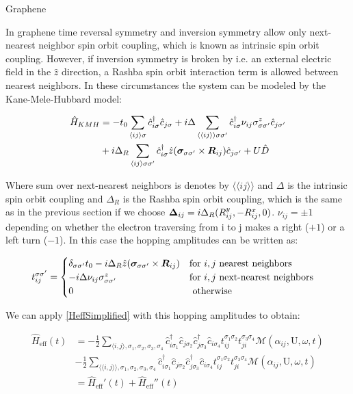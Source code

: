 \begin{section}{Graphene}

In graphene time reversal symmetry and inversion symmetry allow only next-nearest neighbor spin orbit coupling, which is known as intrinsic spin orbit coupling. However, if inversion symmetry is broken by i.e. an external electric field in the $\hat{z}$ direction, a Rashba spin orbit interaction term is allowed between nearest neighbors. In these circumstances the system can be modeled by the Kane-Mele-Hubbard model:

\begin{align}
\hat{H}_{KMH} &= -t_0\sum_{\langle i j \rangle \sigma} \hat{c}^{\dagger}_{i\sigma}\hat{c}_{j\sigma} + i\Delta \sum_{\langle \langle i j \rangle \rangle \sigma \sigma'} \hat{c}^{\dagger}_{i\sigma} \nu_{ij} \sigma^z_{\sigma \sigma'} \hat{c}_{j\sigma'} \nonumber \\
&+ i\Delta_R \sum_{\langle i j \rangle \sigma \sigma'} \hat{c}^{\dagger}_{i\sigma} \hat{z}(\boldsymbol{\sigma}_{\sigma \sigma'} \times \boldsymbol{R}_{ij}) \hat{c}_{j\sigma'} + U\hat{D}
\end{align}

Where sum over next-nearest neighbors is denotes by $\langle \langle i j \rangle \rangle$ and $\Delta$ is the intrinsic spin orbit coupling and $\Delta_R$ is the Rashba spin orbit coupling, which is the same as in the previous section if we choose $\boldsymbol{\Delta}_{ij} = i\Delta_R (R_{ij}^y, - R_{ij}^x, 0)$. $\nu_{ij}=\pm 1$ depending on whether the electron traversing from i to j makes a right ($+1$) or a left turn ($-1$). In this case the hopping amplitudes can be written as:

\begin{equation}
\label{HoppHubbSOI}
t_{ij}^{\sigma \sigma'} = \begin{cases}
	\delta_{\sigma \sigma'}t_0- i\Delta_R \hat{z}(\boldsymbol{\sigma}_{\sigma \sigma'} \times \boldsymbol{R}_{ij}) & \text{for } i, j \text{ nearest neighbors} \\
	-i\Delta \nu_{ij} \sigma_{\sigma \sigma'}^z & \text{for } i, j \text{ next-nearest neighbors} \\
	0 & \text{ otherwise}
\end{cases} \quad
\end{equation}

We can apply \ref{HeffSimplified} with this hopping amplitudes to obtain:

\begin{align*}
\hat{H}_{\text{eff}}(t) &= - \frac{1}{2} \sum_{\langle i,j \rangle, \sigma_1, \sigma_2, \sigma_3, \sigma_4}\hat{c}_{i \sigma_1}^\dagger \hat{c}_{j \sigma_2} \hat{c}_{j \sigma_3}^\dagger \hat{c}_{i \sigma_4} t_{ij}^{\sigma_1 \sigma_2} t_{ji}^{\sigma_3 \sigma_4} \mathcal{M}(\alpha_{ij}, \text{U}, \omega, t) \\
& - \frac{1}{2} \sum_{\langle \langle i,j \rangle \rangle, \sigma_1, \sigma_2, \sigma_3, \sigma_4}\hat{c}_{i \sigma_1}^\dagger \hat{c}_{j \sigma_2} \hat{c}_{j \sigma_3}^\dagger \hat{c}_{i \sigma_4} t_{ij}^{\sigma_1 \sigma_2} t_{ji}^{\sigma_3 \sigma_4} \mathcal{M}(\alpha_{ij}, \text{U}, \omega, t) \\
&= \hat{H}_{\text{eff}}'(t) + \hat{H}_{\text{eff}}''(t)
\end{align*}


\end{section}
